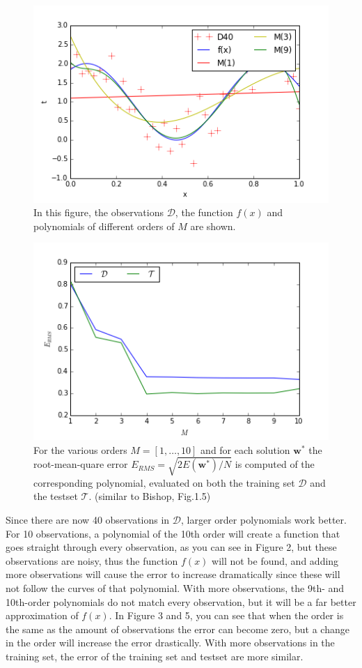 \documentclass[a4paper,11pt]{article}
\theoremstyle{mytheor}
\begin{document}
\begin{enumerate}
\begin{figure}[h!]
			\centering
			\includegraphics[scale=0.8]{1_2_40.png}\vspace{-0.5cm}
			\caption{\vspace{-0.2cm} In this figure, the observations $\mathcal{D}$, the function $f(x)$ and polynomials of different orders of $M$ are shown.}
		\end{figure}
		\begin{figure}[h!]
			\centering
			\includegraphics[scale=0.8]{1_3_40.png}\vspace{-0.5cm}
			\caption{\vspace{-0.2cm} For the various orders $M = [1,\hdots,10]$ and for each solution $\boldsymbol{w}^*$ the root-mean-quare error $E_{RMS} = \sqrt{2E(\boldsymbol{w}^*)/N}$ is computed of the corresponding polynomial, evaluated on both the training set $\mathcal{D}$ and the testset $\mathcal{T}$. (similar to Bishop, Fig.1.5)}
		\end{figure}
		Since there are now 40 observations in $\mathcal{D}$, larger order polynomials work better. For 10 observations, a polynomial of the 10th order will create a function that goes straight through every observation, as you can see in Figure 2, but these observations are noisy, thus the function $f(x)$ will not be found, and adding more observations will cause the error to increase dramatically since these will not follow the curves of that polynomial. With more observations, the 9th- and 10th-order polynomials do not match every observation, but it will be a far better approximation of $f(x)$. In Figure 3 and 5, you can see that when the order is the same as the amount of observations the error can become zero, but a change in the order will increase the error drastically. With more observations in the training set, the error of the training set and testset are more similar. 

\end{enumerate}
\end{document}

